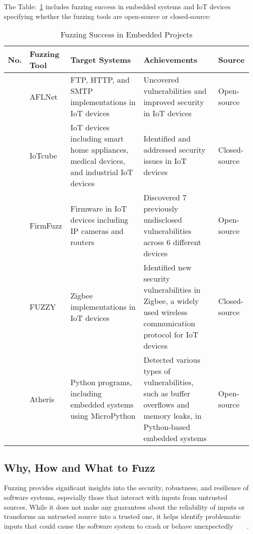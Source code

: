 
The Table:~\ref{tab:embedded_fuzzing_success} includes fuzzing success in embedded systems and IoT devices
specifying whether the fuzzing tools are open-source or closed-source:

\begin{table}[h!]
\centering
\begin{tabularx}{\textwidth}{@{}>{\raggedright\arraybackslash}p{0.5cm}>{\raggedright\arraybackslash}p{1.5cm}>{\raggedright\arraybackslash}p{3.8cm}X>{\raggedright\arraybackslash}p{1.2cm}@{}}
\toprule
\textbf{No.} & \textbf{Fuzzing Tool} & \textbf{Target Systems} & \textbf{Achievements} & \textbf{Source} \\
\midrule
1 & AFLNet & FTP, HTTP, and SMTP implementations in IoT devices & Uncovered vulnerabilities and improved security in IoT devices\cite{lin2020aflnet} & Open-source \\
\addlinespace
2 & IoTcube & IoT devices including smart home appliances, medical devices, and industrial IoT devices & Identified and addressed security issues in IoT devices\cite{kim2019iotcube} & Closed-source \\
\addlinespace
3 & FirmFuzz & Firmware in IoT devices including IP cameras and routers & Discovered 7 previously undisclosed vulnerabilities across 6 different devices\cite{srivastava2019firmfuzz} & Open-source \\
\addlinespace
4 & FUZZY & Zigbee implementations in IoT devices & Identified new security vulnerabilities in Zigbee, a widely used wireless communication protocol for IoT devices\cite{vidas2019fuzzy} & Closed-source \\
\addlinespace
5 & Atheris & Python programs, including embedded systems using MicroPython & Detected various types of vulnerabilities, such as buffer overflows and memory leaks, in Python-based embedded systems\cite{atheris2020} & Open-source \\
\bottomrule
\end{tabularx}
\caption{Fuzzing Success in Embedded Projects}
\label{tab:embedded_fuzzing_success}
\end{table}


\subsection{Why, How and What to Fuzz}

Fuzzing provides significant insights into the security, robustness,
and resilience of software systems, especially those that interact with inputs
from untrusted sources. While it does not make any guarantees about the
reliability of inputs or transforms an untrusted source into a trusted one,
it helps identify problematic inputs that could cause the software system to
crash or behave
unexpectedly~\cite{bohme2020fuzzing}~\cite{beaman2022fuzzing}~\cite{vidas2019fuzzy}~\cite{WhatisFu63:online}.

